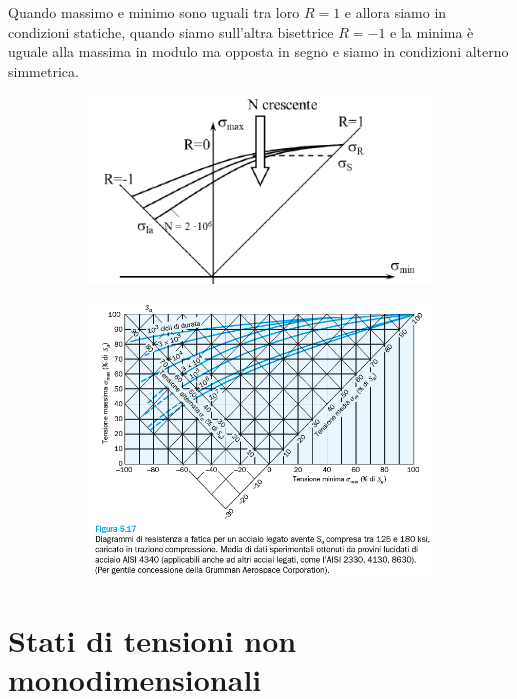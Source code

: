 			Quando massimo e minimo sono uguali tra loro $R=1$ e allora siamo in condizioni statiche, quando siamo sull'altra bisettrice $R=-1$ e la minima è uguale alla massima in modulo ma opposta in segno e siamo in condizioni alterno simmetrica.
			\begin{figure}[H]
				\begin{subfigure}{0.5\textwidth}
					\centering
				\includegraphics[width=0.9\linewidth]{immagini_11/screenshot011}
				\end{subfigure}%
				\begin{subfigure}{0.5\textwidth}
					\centering
				\includegraphics[width=0.9\linewidth]{immagini_11/screenshot012}
				\end{subfigure}
			\end{figure}
			
\section{Stati di tensioni non monodimensionali	}					
			
